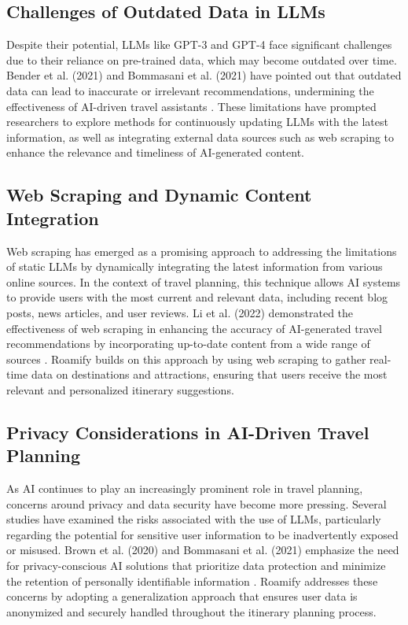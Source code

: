 \documentclass[sigconf,authordraft]{acmart}
\begin{document}
\subsection{Challenges of Outdated Data in LLMs}
Despite their potential, LLMs like GPT-3 and GPT-4 face significant challenges due to their reliance on pre-trained data, which may become outdated over time. Bender et al. (2021) and Bommasani et al. (2021) have pointed out that outdated data can lead to inaccurate or irrelevant recommendations, undermining the effectiveness of AI-driven travel assistants \cite{bender2021stochastic, bommasani2021opportunities}. These limitations have prompted researchers to explore methods for continuously updating LLMs with the latest information, as well as integrating external data sources such as web scraping to enhance the relevance and timeliness of AI-generated content.

\subsection{Web Scraping and Dynamic Content Integration}
Web scraping has emerged as a promising approach to addressing the limitations of static LLMs by dynamically integrating the latest information from various online sources. In the context of travel planning, this technique allows AI systems to provide users with the most current and relevant data, including recent blog posts, news articles, and user reviews. Li et al. (2022) demonstrated the effectiveness of web scraping in enhancing the accuracy of AI-generated travel recommendations by incorporating up-to-date content from a wide range of sources \cite{li2022enhancing}. Roamify builds on this approach by using web scraping to gather real-time data on destinations and attractions, ensuring that users receive the most relevant and personalized itinerary suggestions.

\subsection{Privacy Considerations in AI-Driven Travel Planning}
As AI continues to play an increasingly prominent role in travel planning, concerns around privacy and data security have become more pressing. Several studies have examined the risks associated with the use of LLMs, particularly regarding the potential for sensitive user information to be inadvertently exposed or misused. Brown et al. (2020) and Bommasani et al. (2021) emphasize the need for privacy-conscious AI solutions that prioritize data protection and minimize the retention of personally identifiable information \cite{brown2020language, bommasani2021opportunities}. Roamify addresses these concerns by adopting a generalization approach that ensures user data is anonymized and securely handled throughout the itinerary planning process.
\end{document}
